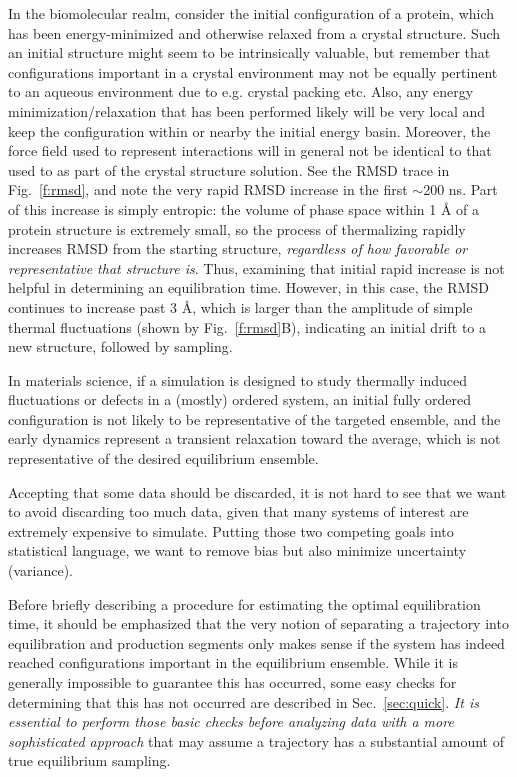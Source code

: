 In the biomolecular realm, consider the initial configuration of a protein, which has been energy-minimized and otherwise relaxed from a crystal structure.
Such an initial structure might seem to be intrinsically valuable, but remember that configurations important in a crystal environment may not be equally pertinent to an aqueous environment due to e.g. crystal packing etc. Also, any energy minimization/relaxation that has been performed likely will be very local and keep the configuration within or nearby the initial energy basin.  Moreover, the force field used to represent interactions will in general not be identical to that used to as part of the crystal structure solution.
See the RMSD trace in Fig.\ \ref{f:rmsd}, and note the very rapid RMSD increase in the first $\sim$200 ns. Part of this increase is simply entropic: the volume of phase space within 1 {\AA} of a protein structure is extremely small, so the process of thermalizing rapidly increases RMSD from the starting structure, \emph{regardless of how favorable or representative that structure is}.  Thus, examining that initial rapid increase is not helpful in determining an equilibration time.  However, in this case, the RMSD continues to increase past 3 {\AA}, which is larger than the amplitude of simple thermal fluctuations (shown by Fig.\ \ref{f:rmsd}B), indicating an initial drift to a new structure, followed by sampling.

In materials science, if a simulation is designed to study thermally induced fluctuations or defects in a (mostly) ordered system,
an initial fully ordered configuration is not likely to be representative of the targeted ensemble, and the early dynamics represent a transient relaxation toward the average, which is not representative of the desired equilibrium ensemble.

Accepting that some data should be discarded, it is not hard to see that we want to avoid discarding too much data, given that many systems of interest are extremely expensive to simulate.
Putting those two competing goals into statistical language, we want to remove bias but also minimize uncertainty (variance).

Before briefly describing a procedure for estimating the optimal equilibration time, it should be emphasized that the very notion of separating a trajectory into equilibration and production segments
only makes sense if the system has indeed reached configurations important in the equilibrium ensemble.
While it is generally impossible to guarantee this has occurred, some easy checks for determining that this has not occurred are described in Sec.\ \ref{sec:quick}.
\emph{It is essential to perform those basic checks before analyzing data with a more sophisticated approach} that may assume a trajectory has a substantial amount of true equilibrium sampling.

